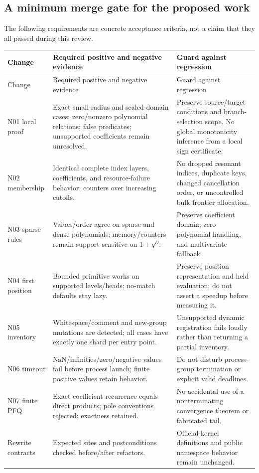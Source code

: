 \documentclass[11pt,letterpaper]{article}
\begin{document}
\subsection{A minimum merge gate for the proposed work}
The following requirements are concrete acceptance criteria, not a claim
that they all passed during this review.

\small
\begin{longtable}{P{0.14\textwidth}P{0.47\textwidth}P{0.30\textwidth}}
\toprule
Change & Required positive and negative evidence & Guard against regression\\
\midrule
\endfirsthead
\toprule Change & Required positive and negative evidence & Guard against regression\\\midrule
\endhead
N01 local proof & Exact small-radius and scaled-domain cases; zero/nonzero polynomial relations; false predicates; unsupported coefficients remain unresolved. & Preserve source/target conditions and branch-selection scope. No global monotonicity inference from a local sign certificate.\\
N02 membership & Identical complete index layers, coefficients, and resource-failure behavior; counters over increasing cutoffs. & No dropped resonant indices, duplicate keys, changed cancellation order, or uncontrolled bulk frontier allocation.\\
N03 sparse rules & Values/order agree on sparse and dense polynomials; memory/counters remain support-sensitive on $1+q^D$. & Preserve coefficient domain, zero polynomial handling, and multivariate fallback.\\
N04 first position & Bounded primitive works on supported levels/heads; no-match defaults stay lazy. & Preserve position representation and held evaluation; do not assert a speedup before measuring it.\\
N05 inventory & Whitespace/comment and new-group mutations are detected; all cases have exactly one shard per entry point. & Unsupported dynamic registration fails loudly rather than returning a partial inventory.\\
N06 timeout & NaN/infinities/zero/negative values fail before process launch; finite positive values retain behavior. & Do not disturb process-group termination or explicit valid deadlines.\\
N07 finite PFQ & Exact coefficient recurrence equals direct products; pole conventions rejected; exactness retained. & No accidental use of a nonterminating convergence theorem or fabricated tail.\\
Rewrite contracts & Expected sites and postconditions checked before/after refactors. & Official-kernel definitions and public namespace behavior remain unchanged.\\
\bottomrule
\end{longtable}
\normalsize
\end{document}
